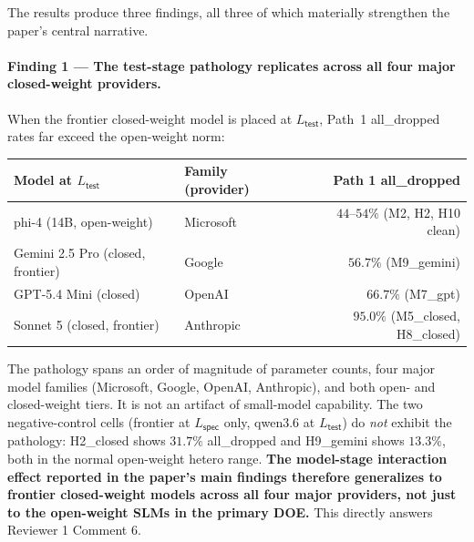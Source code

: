 

The results produce three findings, all three of which materially strengthen the paper's central narrative.

\paragraph{Finding 1 --- The test-stage pathology replicates across all four major closed-weight providers.}
When the frontier closed-weight model is placed at $L_{\textsf{test}}$, Path~1 \textsf{all\_dropped} rates far exceed the open-weight norm:

\begin{center}\small
\begin{tabular}{llr}
\toprule
Model at $L_{\textsf{test}}$ & Family (provider) & Path 1 all\_dropped \\
\midrule
phi-4 (14B, open-weight) & Microsoft    & $44$--$54\%$ (M2, H2, H10 clean) \\
Gemini 2.5 Pro (closed, frontier) & Google       & $56.7\%$ (M9\_gemini) \\
GPT-5.4 Mini (closed) & OpenAI       & $66.7\%$ (M7\_gpt) \\
Sonnet 5 (closed, frontier) & Anthropic   & $95.0\%$ (M5\_closed, H8\_closed) \\
\bottomrule
\end{tabular}
\end{center}

The pathology spans an order of magnitude of parameter counts, four major model families (Microsoft, Google, OpenAI, Anthropic), and both open- and closed-weight tiers. It is not an artifact of small-model capability. The two negative-control cells (frontier at $L_{\textsf{spec}}$ only, qwen3.6 at $L_{\textsf{test}}$) do \emph{not} exhibit the pathology: H2\_closed shows $31.7\%$ \textsf{all\_dropped} and H9\_gemini shows $13.3\%$, both in the normal open-weight hetero range. \textbf{The model-stage interaction effect reported in the paper's main findings therefore generalizes to frontier closed-weight models across all four major providers, not just to the open-weight SLMs in the primary DOE.} This directly answers Reviewer 1 Comment 6.

